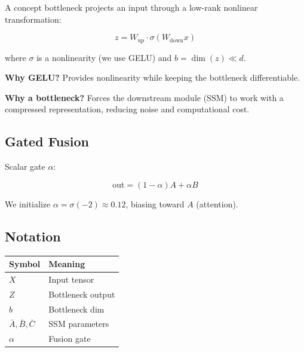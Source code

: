 A concept bottleneck projects an input through a low-rank nonlinear 
transformation:

\[
z = W_\text{up} \cdot \sigma(W_\text{down} x)
\tag{3.5}
\]

where $\sigma$ is a nonlinearity (we use GELU) and $b = \dim(z) \ll d$.

\textbf{Why GELU?} Provides nonlinearity while keeping the bottleneck 
differentiable.

\textbf{Why a bottleneck?} Forces the downstream module (SSM) to work with a 
compressed representation, reducing noise and computational cost.

\subsection{Gated Fusion}

Scalar gate $\alpha$:

\[
\text{out} = (1 - \alpha) A + \alpha B
\tag{3.6}
\]

We initialize $\alpha = \sigma(-2) \approx 0.12$, biasing toward $A$ 
(attention).

\subsection{Notation}

\begin{table}[H]
\centering
\small
\begin{tabular}{ll}
\toprule
\textbf{Symbol} & \textbf{Meaning} \\
\midrule
$X$ & Input tensor \\
$Z$ & Bottleneck output \\
$b$ & Bottleneck dim \\
$\bar{A}, \bar{B}, \bar{C}$ & SSM parameters \\
$\alpha$ & Fusion gate \\
\bottomrule
\end{tabular}
\end{table}

